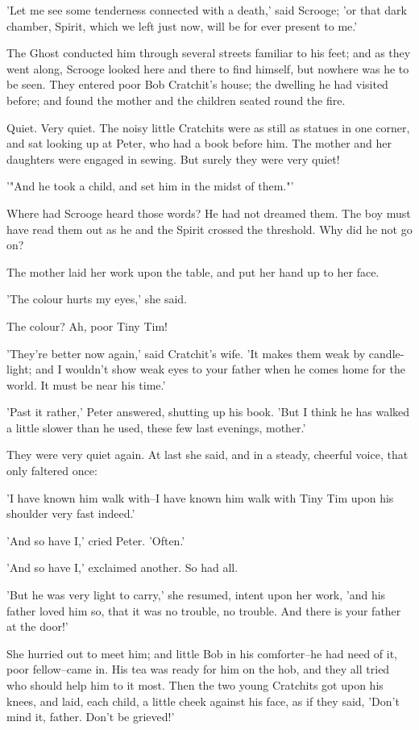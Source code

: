 'Let me see some tenderness connected with a death,' said Scrooge; 'or
that dark chamber, Spirit, which we left just now, will be for ever
present to me.'

The Ghost conducted him through several streets familiar to his feet;
and as they went along, Scrooge looked here and there to find himself,
but nowhere was he to be seen. They entered poor Bob Cratchit's house;
the dwelling he had visited before; and found the mother and the
children seated round the fire.

Quiet. Very quiet. The noisy little Cratchits were as still as statues
in one corner, and sat looking up at Peter, who had a book before him.
The mother and her daughters were engaged in sewing. But surely they
were very quiet!

'"And he took a child, and set him in the midst of them."'

Where had Scrooge heard those words? He had not dreamed them. The boy
must have read them out as he and the Spirit crossed the threshold. Why
did he not go on?

The mother laid her work upon the table, and put her hand up to her
face.

'The colour hurts my eyes,' she said.

The colour? Ah, poor Tiny Tim!

'They're better now again,' said Cratchit's wife. 'It makes them weak by
candle-light; and I wouldn't show weak eyes to your father when he comes
home for the world. It must be near his time.'

'Past it rather,' Peter answered, shutting up his book. 'But I think he
has walked a little slower than he used, these few last evenings,
mother.'

They were very quiet again. At last she said, and in a steady, cheerful
voice, that only faltered once:

'I have known him walk with--I have known him walk with Tiny Tim upon
his shoulder very fast indeed.'

'And so have I,' cried Peter. 'Often.'

'And so have I,' exclaimed another. So had all.

'But he was very light to carry,' she resumed, intent upon her work,
'and his father loved him so, that it was no trouble, no trouble. And
there is your father at the door!'

She hurried out to meet him; and little Bob in his comforter--he had
need of it, poor fellow--came in. His tea was ready for him on the hob,
and they all tried who should help him to it most. Then the two young
Cratchits got upon his knees, and laid, each child, a little cheek
against his face, as if they said, 'Don't mind it, father. Don't be
grieved!'

